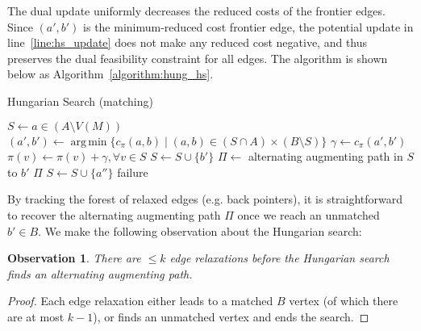 \documentclass[11pt]{article}
\DeclareMathOperator*{\argmin}{arg\,min}
\theoremstyle{plain}
\newtheorem{observation}{Observation}
\begin{document}
The dual update uniformly decreases the reduced costs of the frontier edges.
Since $(a', b')$ is the minimum-reduced cost frontier edge, the potential 
update in line~\ref{line:hs_update} does not make any reduced cost negative, 
and thus preserves the dual feasibility constraint for all edges.
The algorithm is shown below as Algorithm~\ref{algorithm:hung_hs}.

\begin{algorithm}
\caption{Hungarian Search (matching)}
\label{algorithm:hung_hs}
\begin{algorithmic}[1]
\Statex %
	\State $S \gets a \in (A \setminus V(M))$
	\Repeat
		\State $(a', b') \gets \argmin\{c_\pi(a, b) \mid (a, b) \in (S \cap A) \times (B \setminus S)\}$
		\State $\gamma \gets c_\pi(a', b')$
		\State $\pi(v) \gets \pi(v) + \gamma, \forall v \in S$
			\label{line:hs_update}
		\State $S \gets S \cup \{b'\}$
		\Statex %
		 
			\State $\Pi \gets$ alternating augmenting path in $S$ to $b'$
			\State\Return $\Pi$
		\Else {}
			\State $S \gets S \cup \{a''\}$
		\EndIf
	\State\Return failure
\EndFunction
\end{algorithmic}
\end{algorithm}

By tracking the forest of relaxed edges (e.g. back pointers), it is 
straightforward to recover the alternating augmenting path $\Pi$ once we reach an
unmatched $b' \in B$.
We make the following observation about the Hungarian search:

\begin{observation}
\label{observation:hungsearch_length}
	There are $\leq k$ edge relaxations before the Hungarian search finds an 
	alternating augmenting path.
\end{observation}
\begin{proof}
	Each edge relaxation either leads to a matched $B$ vertex (of which 
	there are at most $k-1$), or finds an unmatched vertex and ends the 
	search.
\end{proof}
\end{document}
